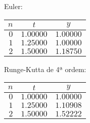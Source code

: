 \documentclass{mnum}
\begin{document}
\begin{center}
\begin{minipage}[c]{0.5\textwidth}
\begin{center} Euler:\\ \begin{tabular}{r | c c}
	$n$ & $t$ & $y$ \\ \hline
	$0$ & $1.00000$ & $1.00000$ \\
	$1$ & $1.25000$ & $1.00000$ \\
	$2$ & $1.50000$ & $1.18750$
\end{tabular} \end{center}
\end{minipage}%
\begin{minipage}[c]{0.5\textwidth}
\begin{center} Runge-Kutta de 4ª ordem:\\ \begin{tabular}{r | c c}
	$n$ & $t$ & $y$ \\ \hline
	$0$ & $1.00000$ & $1.00000$ \\
	$1$ & $1.25000$ & $1.10908$ \\
	$2$ & $1.50000$ & $1.52222$
\end{tabular} \end{center}
\end{minipage}
\end{center}
\end{document}
